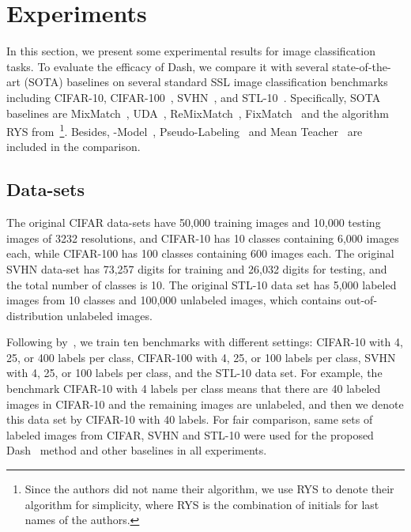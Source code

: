 \documentclass{article}
\def \Alg {Dash}
\begin{document}
\section{Experiments}
In this section, we present some experimental results for image classification tasks. To evaluate the efficacy of \Alg, we compare it with several state-of-the-art (SOTA) baselines on several standard SSL image classification benchmarks including CIFAR-10, CIFAR-100~\citep{krizhevsky2009learning}, SVHN~\citep{Netzer201137648}, and STL-10~\citep{coates2011analysis}. Specifically, SOTA baselines are MixMatch~\citep{berthelot2019mixmatch}, UDA~\citep{xie2020unsupervised}, ReMixMatch~\citep{berthelot2019remixmatch}, FixMatch~\citep{sohn2020fixmatch} and the algorithm RYS from~\citep{ren2020not}\footnote{Since the authors did not name their algorithm, we use RYS to denote their algorithm for simplicity, where RYS is the combination of initials for 
last names of the authors.}. Besides, -Model~\citep{rasmus2015semi}, Pseudo-Labeling~\citep{lee2013pseudo} and Mean Teacher~\citep{tarvainen2017mean} are included in the comparison. 

\subsection{Data-sets} 
The original CIFAR data-sets have 50,000 training images and 10,000 testing images of 3232 resolutions, and CIFAR-10 has 10 classes containing 6,000 images each, while CIFAR-100 has 100 classes containing 600 images each. The original SVHN data-set has 73,257 digits for training and 26,032 digits for testing, and the total number of classes is 10. The original STL-10 data set has 5,000 labeled images from 10 classes and 100,000 unlabeled images, which contains out-of-distribution unlabeled images. 

Following by~\citep{sohn2020fixmatch}, we train ten benchmarks with different settings: CIFAR-10 with 4, 25, or 400 labels per class, CIFAR-100 with 4, 25, or 100 labels per class, SVHN with 4, 25, or 100 labels per class, and the STL-10 data set. For example, the benchmark CIFAR-10 with 4 labels per class means that there are 40 labeled images in CIFAR-10 and the remaining images are unlabeled, and then we denote this data set by CIFAR-10 with 40 labels. For fair comparison, same sets of labeled images from CIFAR, SVHN and STL-10 were used for the proposed \Alg~ method and other baselines in all experiments.
\end{document}
